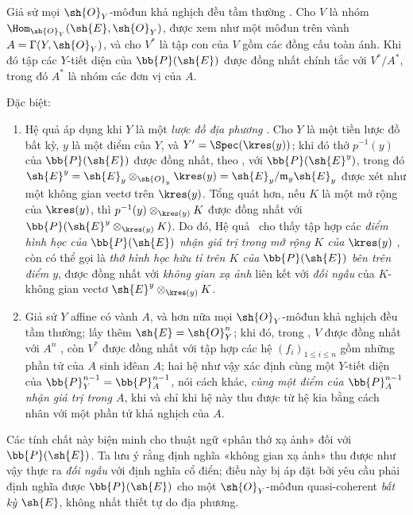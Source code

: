 \documentclass[oneside,10pt]{amsart}
\renewcommand{\leq}{\leqslant}
\newcommand{\oldpage}[2][]{\marginnote{\normalfont\footnotesize\textbf{#1}~|~#2}\ignorespaces}
\let\EGAOriginalLabel\label
\renewcommand{\label}[1]{\phantomsection\EGAOriginalLabel{#1}}
\begin{document}
\begin{corollary}[4.2.6]
\label{II.4.2.6}
Giả sử mọi $\sh{O}_Y$-môđun khả nghịch đều tầm thường .
Cho $V$ là nhóm $\Hom_{\sh{O}_Y}(\sh{E},\sh{O}_Y)$, được xem như một môđun trên vành $A=\Gamma(Y,\sh{O}_Y)$, và cho $V^*$ là tập con của $V$ gồm các đồng cấu toàn ánh.
Khi đó tập các $Y$-tiết diện của $\bb{P}(\sh{E})$ được đồng nhất chính tắc với $V^*/A^*$, trong đó $A^*$ là nhóm các đơn vị của $A$.
\end{corollary}
\oldpage[II]{75}
Đặc biệt:
\begin{enumerate}
  \item Hệ quả  áp dụng khi $Y$ là một \emph{lược đồ địa phương} .
    Cho $Y$ là một tiền lược đồ bất kỳ, $y$ là một điểm của $Y$, và $Y'=\Spec(\kres(y))$;
    khi đó thớ $p^{-1}(y)$ của $\bb{P}(\sh{E})$ được đồng nhất, theo , với $\bb{P}(\sh{E}^y)$, trong đó $\sh{E}^y=\sh{E}_y\otimes_{\sh{O}_y}\kres(y)=\sh{E}_y/\mathfrak{m}_y\sh{E}_y$ được xét như một không gian vectơ trên $\kres(y)$.
    Tổng quát hơn, nếu $K$ là một mở rộng của $\kres(y)$, thì $p^{-1}(y)\otimes_{\kres(y)}K$ được đồng nhất với $\bb{P}(\sh{E}^y\otimes_{\kres(y)}K)$.
    Do đó, Hệ quả~ cho thấy tập hợp các \emph{điểm hình học của $\bb{P}(\sh{E})$ nhận giá trị trong mở rộng $K$ của $\kres(y)$} , còn có thể gọi là \emph{thớ hình học hữu tỉ trên $K$ của $\bb{P}(\sh{E})$ bên trên điểm $y$}, được đồng nhất với \emph{không gian xạ ảnh} liên kết với \emph{đối ngẫu} của $K$-không gian vectơ $\sh{E}^y\otimes_{\kres(y)}K$.
  \item Giả sử $Y$ affine có vành $A$, và hơn nữa mọi $\sh{O}_Y$-môđun khả nghịch đều tầm thường;
    lấy thêm $\sh{E}=\sh{O}_Y^n$;
    khi đó, trong , $V$ được đồng nhất với $A^n$ , còn $V^*$ được đồng nhất với tập hợp các hệ $(f_i)_{1\leq i\leq n}$ gồm những phần tử của $A$ sinh iđêan $A$;
    hai hệ như vậy xác định cùng một $Y$-tiết diện của $\bb{P}_Y^{n-1}=\bb{P}_A^{n-1}$, nói cách khác, \emph{cùng một điểm của $\bb{P}_A^{n-1}$ nhận giá trị trong $A$}, khi và chỉ khi hệ này thu được từ hệ kia bằng cách nhân với một phần tử khả nghịch của $A$.
\end{enumerate}

Các tính chất này biện minh cho thuật ngữ «phân thớ xạ ảnh» đối với $\bb{P}(\sh{E})$.
Ta lưu ý rằng định nghĩa «không gian xạ ảnh» thu được như vậy thực ra \emph{đối ngẫu} với định nghĩa cổ điển;
điều này bị áp đặt bởi yêu cầu phải định nghĩa được $\bb{P}(\sh{E})$ cho một $\sh{O}_Y$-môđun quasi-coherent \emph{bất kỳ} $\sh{E}$, không nhất thiết tự do địa phương.
\end{document}
